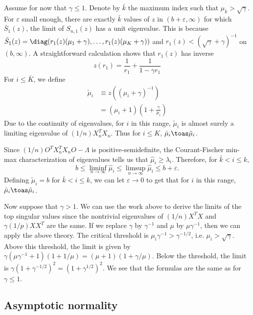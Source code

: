Assume for now that $\gamma \leq 1$.  Denote by $\bar k$ the maximum index such that $\mu_{\bar k} > \sqrt{\gamma}$.  For $\varepsilon$ small enough, there are exactly $\bar k$ values of $z$ in  $(b + \varepsilon, \infty)$ for which $\bar S_1(z)$, the limit of $S_{n,1}(z)$ has a unit eigenvalue.  This is because 
\(
    \bar S_1(z) 
    = 
    \diag( r_1(z) (\mu_1 + \gamma), \ldots, r_1(z) (\mu_K + \gamma))
\)
and $r_1(z) < (\sqrt{\gamma} + \gamma)^{-1}$ on $(b, \infty)$.  A straightforward calculation shows that $r_1(z)$ has inverse
\[
    z(r_1)
    =
    \frac{1}{r_1}
    + 
    \frac{1}{1 - \gamma r_1}
\]
For $i \leq \bar K$, we define
\begin{align*}
    \tilde \mu_i
    &\equiv z\left( (\mu_i + \gamma)^{-1} \right) \\
    &= \left( \mu_i + 1 \right) 
       \left( 1 + \frac{\gamma}{\mu_i} \right)
\end{align*}
Due to the continuity of eigenvalues, for $i$ in this range, $\tilde \mu_i$ is
almost surely a limiting eigenvalue of $(1/n) X_n^T X_n$.  Thus for $i \leq K$,
$\hat \mu_i \toas \tilde \mu_i$.

Since $(1/n) O^T X_n^T X_n O - \Lambda$ is positive-semidefinite, the
Courant-Fischer min-max characterization of eigenvalues tells us that
$\hat \mu_i \geq \lambda_i$. Therefore, for $\bar k < i \leq k$,
\[
    b
    \leq
    \liminf_{n \to \infty} \hat \mu_i
    \leq
    \limsup_{n \to \infty} \hat \mu_i    
    \leq
    b + \varepsilon.
\]
Defining $\tilde \mu_i = b$ for $\bar k < i \leq k$, we can let
$\varepsilon \to 0$ to get that for $i$ in this range,
$\hat \mu_i \toas \tilde \mu_i$.

Now suppose that $\gamma > 1$.  We can use the work above to derive the limits of the top singular values since the nontrivial eigenvalues of $(1/n) X^T X$ and $\gamma (1/p) X X^T$ are the same.  If we replace $\gamma$ by $\gamma^{-1}$ and $\mu$ by $\mu \gamma^{-1}$, then we can apply the above theory.  The critical threshold is $\mu_i \gamma^{-1} > \gamma^{-1/2}$, i.e. $\mu_i > \sqrt{\gamma}$.  Above this threshold, the limit is given by $\gamma ( \mu \gamma^{-1} + 1)(1 + 1/\mu) = (\mu + 1)\left( 1 + \gamma/\mu \right)$.  Below the threshold, the limit is $\gamma (1 + \gamma^{-1/2})^2 = (1 + \gamma^{1/2})^2$.  We see that the formulas are the same as for $\gamma \leq 1$.

\subsection{Asymptotic normality}

